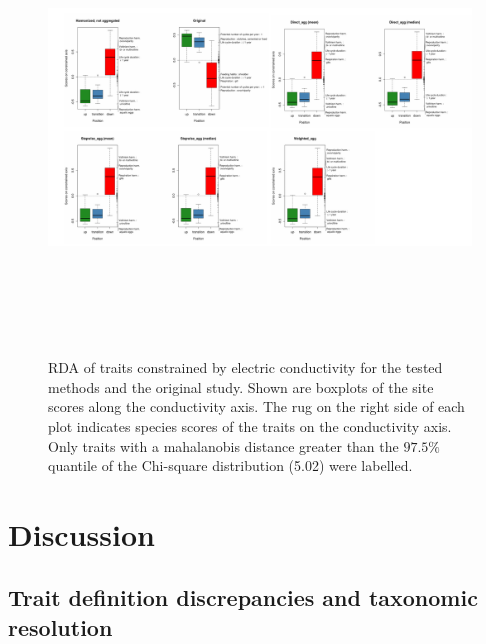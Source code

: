 \documentclass{article}
\begin{document}
\begin{figure}
  \label{fig:boxplots_scores_on_constrained_axis}
  \centering
  \includegraphics[width= 22cm, height=12cm]{Scores_on_constrained_axis_combined.pdf}
  \caption{RDA of traits constrained by electric conductivity for the tested methods and the original study. Shown are boxplots of the site scores along the conductivity axis. The rug on the right side of each plot indicates species scores of the traits on the conductivity axis. Only traits with a mahalanobis distance greater than the $97.5 \%$ quantile of the Chi-square distribution (5.02) were labelled.}
\end{figure}

\newpage


\section*{Discussion}

\subsection*{Trait definition discrepancies and taxonomic resolution}
\end{document}
